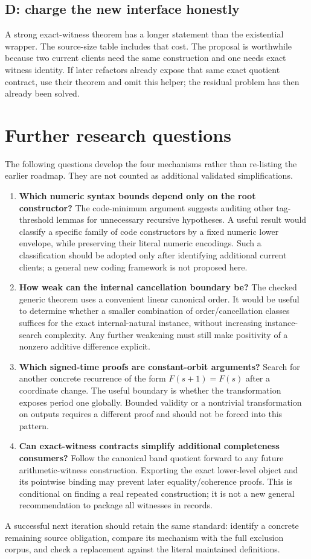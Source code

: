 \documentclass[11pt,letterpaper]{article}
\begin{document}
\subsection{D: charge the new interface honestly}
A strong exact-witness theorem has a longer statement than the existential wrapper. The source-size table includes that cost. The proposal is worthwhile because two current clients need the same construction and one needs exact witness identity. If later refactors already expose that same exact quotient contract, use their theorem and omit this helper; the residual problem has then already been solved.

\section{Further research questions}
The following questions develop the four mechanisms rather than re-listing the earlier roadmap. They are not counted as additional validated simplifications.

\begin{enumerate}
\item \textbf{Which numeric syntax bounds depend only on the root constructor?} The code-minimum argument suggests auditing other tag-threshold lemmas for unnecessary recursive hypotheses. A useful result would classify a specific family of code constructors by a fixed numeric lower envelope, while preserving their literal numeric encodings. Such a classification should be adopted only after identifying additional current clients; a general new coding framework is not proposed here.
\item \textbf{How weak can the internal cancellation boundary be?} The checked generic theorem uses a convenient linear canonical order. It would be useful to determine whether a smaller combination of order/cancellation classes suffices for the exact internal-natural instance, without increasing instance-search complexity. Any further weakening must still make positivity of a nonzero additive difference explicit.
\item \textbf{Which signed-time proofs are constant-orbit arguments?} Search for another concrete recurrence of the form \(F(s+1)=F(s)\) after a coordinate change. The useful boundary is whether the transformation exposes period one globally. Bounded validity or a nontrivial transformation on outputs requires a different proof and should not be forced into this pattern.
\item \textbf{Can exact-witness contracts simplify additional completeness consumers?} Follow the canonical band quotient forward to any future arithmetic-witness construction. Exporting the exact lower-level object and its pointwise binding may prevent later equality/coherence proofs. This is conditional on finding a real repeated construction; it is not a new general recommendation to package all witnesses in records.
\end{enumerate}
A successful next iteration should retain the same standard: identify a concrete remaining source obligation, compare its mechanism with the full exclusion corpus, and check a replacement against the literal maintained definitions.
\end{document}
